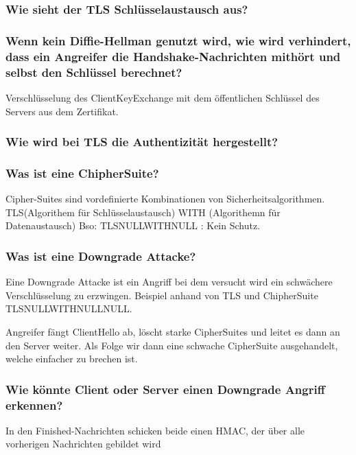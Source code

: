 	\subsubsection{Wie sieht der TLS Schlüsselaustausch aus?}


	
	\subsubsection{Wenn kein Diffie-Hellman genutzt wird, wie wird verhindert, dass ein Angreifer die Handshake-Nachrichten mithört und selbst den Schlüssel berechnet?} 
	Verschlüsselung des ClientKeyExchange mit dem öffentlichen Schlüssel des Servers aus dem Zertifikat.
	
	

	\subsubsection{Wie wird bei TLS die Authentizität hergestellt?}
		
	
	\subsubsection{Was ist eine ChipherSuite?}
	Cipher-Suites sind vordefinierte Kombinationen von Sicherheitsalgorithmen.
	TLS\textunderscore (Algorithem für Schlüsselaustausch) WITH (Algorithemn für Datenaustausch)
	Bso: TLS\textunderscore NULL\textunderscore WITH\textunderscore NULL : Kein Schutz.
	
	\subsubsection{Was ist eine Downgrade Attacke?}
	Eine Downgrade Attacke ist ein Angriff bei dem versucht wird ein schwächere Verschlüsselung zu erzwingen. Beispiel anhand von TLS und ChipherSuite TLS\textunderscore NULL\textunderscore WITH\textunderscore NULL\textunderscore NULL.	
	
	Angreifer fängt ClientHello ab, löscht starke CipherSuites und leitet es dann an den Server weiter. Als Folge wir dann eine schwache CipherSuite ausgehandelt, welche einfacher zu brechen ist.
	\subsubsection{Wie könnte Client oder Server einen Downgrade Angriff erkennen?}
	In den Finished-Nachrichten schicken beide einen HMAC, der über alle vorherigen Nachrichten gebildet wird
	
